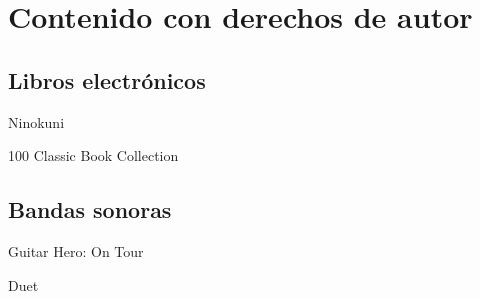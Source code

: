 
\section[Contenido con copyright]{Contenido con derechos de autor}
\subsection{Libros electrónicos}
\begin{frame}{Ninokuni}

\end{frame}

\begin{frame}{100 Classic Book Collection}

\end{frame}

\subsection{Bandas sonoras}
\begin{frame}{Guitar Hero: On Tour}

\end{frame}

\begin{frame}{Duet}

\end{frame}
